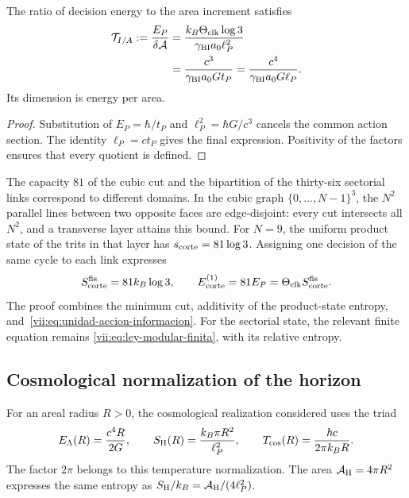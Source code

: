 \begin{proposition}
\label{vii:prop:tension-informacion-area}
The ratio of decision energy to the area increment satisfies
\begin{equation}
 \begin{aligned}
 \mathcal T_{I/A}:=\frac{E_P}{\delta\mathcal A}
 &=\frac{k_B\Theta_{\rm clk}\log3}{\gamma_{\rm BI}a_0\ell_P^2}\\
 &=\frac{c^3}{\gamma_{\rm BI}a_0G t_P}
  =\frac{c^4}{\gamma_{\rm BI}a_0G\ell_P}.
 \end{aligned}
 \label{vii:eq:tension-informacion-area}
\end{equation}
Its dimension is energy per area.
\end{proposition}
\begin{proof}
Substitution of \(E_P=\hbar/t_P\) and
\(\ell_P^2=\hbar G/c^3\) cancels the common action section.
The identity \(\ell_P=ct_P\) gives the final expression. Positivity
of the factors ensures that every quotient is defined.
\end{proof}

The capacity \(81\) of the cubic cut and the bipartition of the thirty-six
sectorial links correspond to different domains. In the
cubic graph \(\{0,\ldots,N-1\}^3\), the \(N^2\) parallel lines
between two opposite faces are edge-disjoint: every cut
intersects all \(N^2\), and a transverse layer attains this bound.
For \(N=9\), the uniform product state of the trits in that layer
has \(s_{\rm corte}=81\log3\). Assigning one decision of the
same cycle to each link expresses
\begin{equation}
 S_{\rm corte}^{\rm fis}=81k_B\log3,\qquad
 E_{\rm corte}^{(1)}=81E_P
                  =\Theta_{\rm clk}S_{\rm corte}^{\rm fis}.
 \label{vii:eq:corte-energia-informacion}
\end{equation}
The proof combines the minimum cut, additivity of the product-state
entropy, and~\eqref{vii:eq:unidad-accion-informacion}. For the sectorial
state, the relevant finite equation remains
\eqref{vii:eq:ley-modular-finita}, with its relative entropy.

\subsection{Cosmological normalization of the horizon}
\label{vii:subsec:balance-horizonte}

For an areal radius \(R>0\), the cosmological realization considered
uses the triad
\begin{equation}
 E_\Lambda(R)=\frac{c^4R}{2G},\qquad
 S_{\rm H}(R)=\frac{k_B\pi R^2}{\ell_P^2},\qquad
 T_{\rm cos}(R)=\frac{\hbar c}{2\pi k_BR}.
 \label{vii:eq:horizonte-cosmologico}
\end{equation}
The factor \(2\pi\) belongs to this temperature normalization.
The area \(\mathcal A_{\rm H}=4\pi R^2\) expresses the same entropy
as \(S_{\rm H}/k_B=\mathcal A_{\rm H}/(4\ell_P^2)\).

